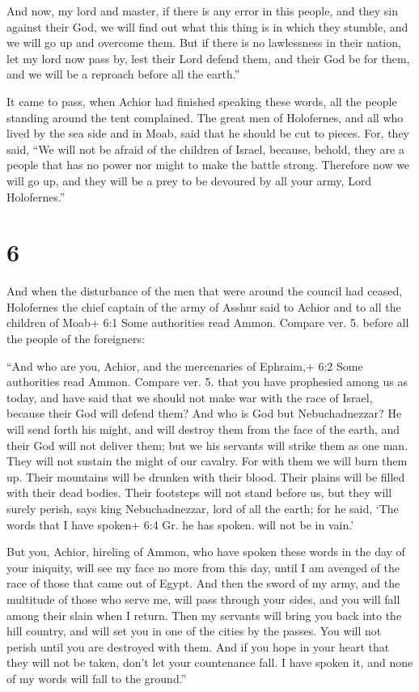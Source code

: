  And now, my lord and master, if there is any error in this
people, and they sin against their God, we will find out what this thing
is in which they stumble, and we will go up and overcome them.
 But if there is no lawlessness in their nation, let my
lord now pass by, lest their Lord defend them, and their God be for
them, and we will be a reproach before all the earth.''

 It came to pass, when Achior had finished speaking these
words, all the people standing around the tent complained. The great men
of Holofernes, and all who lived by the sea side and in Moab, said that
he should be cut to pieces.  For, they said, ``We will not
be afraid of the children of Israel, because, behold, they are a people
that has no power nor might to make the battle strong. 
Therefore now we will go up, and they will be a prey to be devoured by
all your army, Lord Holofernes.''

\hypertarget{section-5}{%
\section{6}\label{section-5}}

 And when the disturbance of the men that were around the
council had ceased, Holofernes the chief captain of the army of Asshur
said to Achior and to all the children of Moab+ 6:1 Some authorities
read Ammon. Compare ver. 5. before all the people of the foreigners:

 ``And who are you, Achior, and the mercenaries of Ephraim,+
6:2 Some authorities read Ammon. Compare ver. 5. that you have
prophesied among us as today, and have said that we should not make war
with the race of Israel, because their God will defend them? And who is
God but Nebuchadnezzar?  He will send forth his might, and
will destroy them from the face of the earth, and their God will not
deliver them; but we his servants will strike them as one man. They will
not sustain the might of our cavalry.  For with them we will
burn them up. Their mountains will be drunken with their blood. Their
plains will be filled with their dead bodies. Their footsteps will not
stand before us, but they will surely perish, says king Nebuchadnezzar,
lord of all the earth; for he said, `The words that I have spoken+ 6:4
Gr. he has spoken. will not be in vain.'

 But you, Achior, hireling of Ammon, who have spoken these
words in the day of your iniquity, will see my face no more from this
day, until I am avenged of the race of those that came out of Egypt.
 And then the sword of my army, and the multitude of those
who serve me, will pass through your sides, and you will fall among
their slain when I return.  Then my servants will bring you
back into the hill country, and will set you in one of the cities by the
passes.  You will not perish until you are destroyed with
them.  And if you hope in your heart that they will not be
taken, don't let your countenance fall. I have spoken it, and none of my
words will fall to the ground.''

